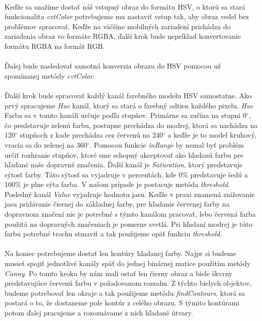 \documentclass[12pt]{article}
\begin{document}
\paragraph{}
Keďže sa snažíme dostať náš vstupný obraz do formátu HSV, o ktorú sa stará funkcionalita \emph{cvtColor} 
potrebujeme mu nastaviť vstup tak, aby obraz vedel bez problémov spracovať. 
Keďže na väčšine mobilných zariadení prichádza do zariadenia obraz vo formáte RGBA, ďalší krok bude nepríklad konvertovanie formátu RGBA na formát RGB.
\paragraph{}
Ďalej bude nasledovať samotná konverzia obrazu do HSV pomocou už spomínanej metódy \emph{cvtColor}.
\paragraph{}
Ďalší krok bude spracovať každý kanál farebného modelu HSV samostatne. Ako prvý spracujeme \emph{Hue} kanál, ktorý sa stará o farebný odtien každého pixelu.
\emph{Hue} Farba sa v tomto kanáli určuje podľa stupňov. 
Primárne sa začína na stupni 0$^\circ$, čo predstavuje zelenú farbu, postupne prechádza do modrej,
ktorá sa nachádza na 120$^\circ$ stupňoch z kade prechádza cez červenú na 240$^\circ$ a keďže je to model kruhový, vracia sa do zelenej na 360$^\circ$.
Pomocou funkcie \emph{inRange} by nemal byť problém určiť rozhranie stupňov, ktoré sme schopný akceptovať ako hľadanú farbu pre hľadané naše dopravné značenia.
Ďalší kanál je \emph{Saturation}, ktorý predstavuje sýtosť farby. Táto sýtosť sa vyjadruje v percentách, kde 0\% predstavuje šedú a 100\% je plne sýta farba.\cite{hsv_wiki_cz} 
V našom prípade je postacuje metóda \emph{threshold}. Posledný kanál \emph{Value} vyjadruje hodnotu jasu.
Keďže v praxi znamená znižovanie jasu pridávanie čiernej do základnej farby,
pre hľadanie červenej farby na dopravnom značení nie je potrebné s týmto kanálom pracovať, lebo červená farba použitá na dopravných značeniach je pomerne svetlá.
Pri hľadaní modrej je túto farbu potrebné trochu stmaviť a tak použijeme opäť funkciu \emph{threshold}.
\paragraph{}
Na koniec potrebujeme dostať len kontúry hľadanej farby. 
Najpr si budeme musieť spojiť jednotlivé kanály späť do jednej binárnej matice použitím metódy \emph{Canny}. 
Po tomto kroku by nám mali ostať len čierny obraz a biele škvrny predstavujúce červenú farbu v požadovanom rozsahu.
Z týchto bielych objektov, budeme potrebovať len okraje a tak použijeme metódu \emph{findContours}, ktorá sa postará o to, že dostaneme pole kontúr z celého obrazu.
S týmito kontúrami potom ďalej pracujeme a rozoznávame z nich hľadané útvary.
\end{document}
